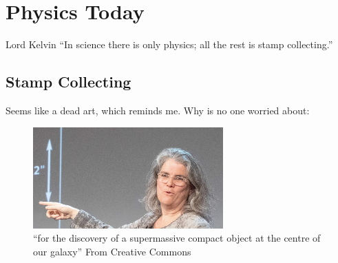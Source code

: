 \documentclass[../rzero]{subfiles}
\begin{document}
\chapter{Physics Today}\label{physicsTodayChapter}

\begin{chapquote}{Lord Kelvin}
``In science there is only physics; all the rest is stamp collecting.''
\end{chapquote}





\section{Stamp Collecting}
Seems like a dead art, which reminds me. Why is no one worried about:
\begin{figure}\label{andrea-ghez}
\includegraphics[width=0.65\textwidth]{chapters/images/andrea-ghez.jpg}
\caption{“for the discovery of a supermassive compact object at the centre of our galaxy”   From\cite{borderlinerebelEnglishAndreaGhez2019} Creative Commons}
\end{figure}
\end{document}
